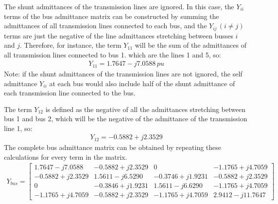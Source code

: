 The shunt admittances of the transmission lines are ignored. In this case, the $Y_{ii}$ terms of the bus admittance matrix can be constructed by summing the admittances of all transmission lines connected to each bus, and the $Y_{ij}\, (i \neq j)$ terms are just the negative of the line admittances stretching between busses $i$ and $j$. Therefore, for instance, the term $Y_{11}$ will be the sum of the admittances of all transmission lines connected to bus 1. which are the lines 1 and 5, so:
\begin{gather}
	Y_{11} = 1.7647 - j7.0588\, \si{pu}
\end{gather}
Note: if the shunt admittances of the transmission lines are not ignored, the self admittance $Y_{ii}$ at each bus would also include half of the shunt admittance of each transmission line connected to the bus.

The term $Y_{12}$ is defined as the negative of all the admittances stretching between bus 1 and bus 2, which will be the negative of the admittance of the transmission line 1, so:
\begin{gather}
	Y_{12} = -0.5882 + j2.3529
\end{gather}
The complete bus admittance matrix can be obtained by repeating these calculations for every term in the matrix.
\begin{gather}
	Y_{bus} = \begin{bmatrix}
		1.7647-j7.0588 & -0.5882 + j2.3529 & 0 & -1.1765 + j4.7059\\
		-0.5882 + j2.3529 & 1.5611-j6.5290 & -0.3746 + j1.9231 & -0.5882 + j2.3529\\
		0 & -0.3846+j1.9231 & 1.5611-j6.6290 & -1.1765 + j4.7059\\
		-1.1765+j4.7059 & -0.5882 + j2.3529 & -1.1765 + j4.7059 & 2.9412 - j11.7647
		\end{bmatrix}
\end{gather}
